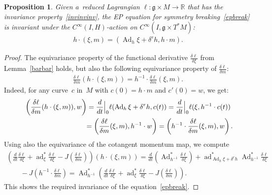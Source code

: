 \documentclass[pdftex]{sigma}
\numberwithin{equation}{section}
\newtheorem{Proposition}[Theorem]{Proposition}
{ \theoremstyle{definition}
\newtheorem{Example}[Theorem]{Example}
\newtheorem{Remark}[Theorem]{Remark} }
\begin{document}
\begin{Proposition}
\label{thmb}
Given a~reduced Lagrangian $\ell:\mathfrak g\times M\to\mathbb R$ that has the invariance pro\-per\-ty~\eqref{invinvinv},
the EP equation for symmetry breaking~\eqref{epbreak} is invariant under the $C^{\infty}(I,H)$-action on
$C^{\infty}(I,\mathfrak g\times T^*M)$:
\begin{gather*}
h\cdot (\xi,m)=(\operatorname{Ad}_h\xi+\delta^rh,{h}\cdot m).
\end{gather*}
\end{Proposition}

\begin{proof}
The equivariance property of the functional derivative $\frac{\delta\ell}{\delta\xi}$ from Lemma~\ref{barbar} holds, but
also the following equivariance property of $\frac{\delta\ell}{\delta m}$:
\begin{gather*}
\frac{\delta\ell}{\delta m}(h\cdot(\xi, m))={h^{-1}}\cdot\frac{\delta \ell}{\delta m}(\xi,m).
\end{gather*}
Indeed, for any curve~$c$ in~$M$ with $c(0)=h\cdot m$ and $c'(0)=w$, we get:
\begin{gather*}
\left(\frac{\delta\ell}{\delta m}(h\cdot(\xi,m)),w\right)
=\frac{d}{dt}\Big|_0\ell(\operatorname{Ad}_h\xi+\delta^rh,c(t)) =\frac{d}{dt}\Big|_0\ell(\xi,h^{-1}\cdot c(t))
\\
\hphantom{\left(\frac{\delta\ell}{\delta m}(h\cdot(\xi,m)),w\right)}{}
=\left(\frac{\delta\ell}{\delta m}(\xi,m),h^{-1}\cdot w\right) =\left(h^{-1}\cdot\frac{\delta\ell}{\delta
m}(\xi,m),w\right).
\end{gather*}
Using also the equivariance of the cotangent momentum map, we compute
\begin{gather*}
\left(\frac{d}{dt}\frac{\delta\ell}{\delta\xi}+\operatorname{ad}^*_\xi\frac{\delta
\ell}{\delta\xi}-J\left(\frac{\delta\ell}{\delta m}\right)\right)(h\cdot (\xi,m))
 =\frac{d}{dt}\left(\operatorname{Ad}^*_{h^{-1}}\frac{\delta \ell}{\delta\xi}\right)
+\operatorname{ad}^*_{\operatorname{Ad}_h\xi+\delta^rh}\operatorname{Ad}^*_{h^{-1}}\frac{\delta\ell}{\delta\xi}
\\
\qquad
{}-J\left(h^{-1}\cdot\frac{\delta\ell}{\delta
m}\right) =\operatorname{Ad}^*_{h^{-1}}\left(\frac{d}{dt}\frac{\delta\ell}{\delta\xi}+\operatorname{ad}^*_\xi\frac{\delta
\ell}{\delta\xi}-J\left(\frac{\delta\ell}{\delta m}\right)\right).
\end{gather*}
This shows the required invariance of the equation~\eqref{epbreak}.
\end{proof}
\end{document}
